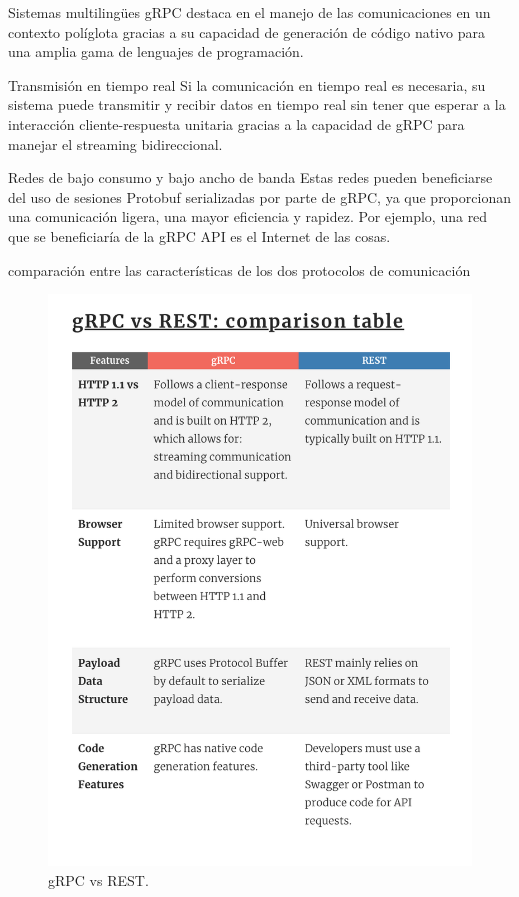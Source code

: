Sistemas multilingües
gRPC destaca en el manejo de las comunicaciones en un contexto políglota gracias a su capacidad de generación de código nativo para una amplia gama de lenguajes de programación.

Transmisión en tiempo real
Si la comunicación en tiempo real es necesaria, su sistema puede transmitir y recibir datos en tiempo real sin tener que esperar a la interacción cliente-respuesta unitaria gracias a la capacidad de gRPC para manejar el streaming bidireccional.

Redes de bajo consumo y bajo ancho de banda
Estas redes pueden beneficiarse del uso de sesiones Protobuf serializadas por parte de gRPC, ya que proporcionan una comunicación ligera, una mayor eficiencia y rapidez. Por ejemplo, una red que se beneficiaría de la gRPC API es el Internet de las cosas.

comparación entre las características de los dos protocolos de comunicación

\begin{figure}[H]
    \centering
    \includegraphics[height=0.3\textheight]{./part/Proyecto_ejecutivo/memoria_constructiva/rpc/img/rpcComparison}
    \caption{gRPC vs REST.\cite{berga_santos_2023}}\label{fig:gRPC vs REST}
\end{figure}

